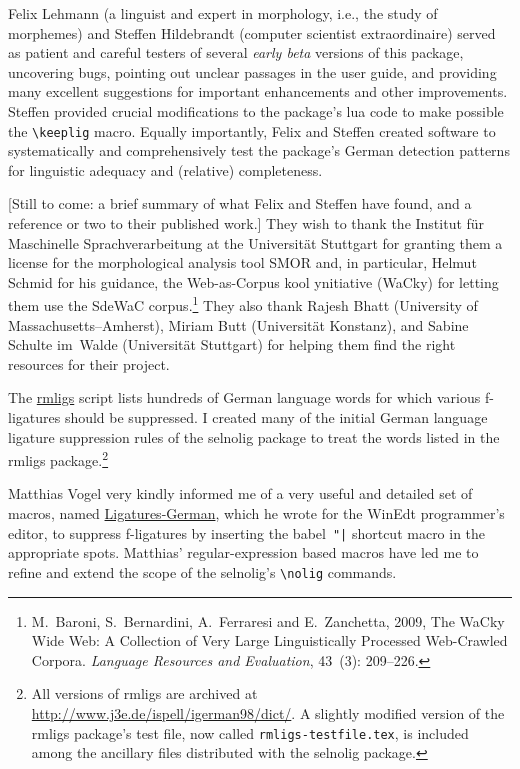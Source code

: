 \documentclass[12pt]{article}
\newcommand{\pkg}[1]{\textsf{#1}}
\newcommand{\opt}[1]{\texttt{#1}}
\newcommand{\cmmd}[1]{\texttt{\textbackslash #1}}
\begin{document}
Felix Lehmann (a linguist and expert in morphology, i.e., the study of morphemes) and Steffen Hildebrandt (computer scientist extraordinaire) served as patient and careful testers of several \emph{early beta} versions of this package, uncovering bugs, pointing out unclear passages in the user guide, and providing many excellent suggestions for important enhancements and other improvements. Steffen provided crucial modifications to the package's lua code to make possible the \cmmd{keeplig} macro. Equally importantly, Felix and Steffen created software to systematically and comprehensively test the package's German detection patterns for linguistic adequacy and (relative) completeness.

[Still to come: a brief summary of what Felix and Steffen have found, and a reference or two to their published work.] They wish to thank the Institut für Maschinelle Sprachverarbeitung at the Universität Stuttgart for granting them a license for the morphological analysis tool SMOR and, in particular, Helmut Schmid for his guidance, the Web-as-Corpus kool ynitiative (WaCky) for letting them use the SdeWaC corpus.\footnote{M.~Baroni, S.~Bernardini, A.~Ferraresi and E.~Zanchetta, 2009, The WaCky Wide Web: A Collection of Very Large Linguistically Processed Web-Crawled Corpora. \emph{Language Resources and Evaluation}, 43~(3): 209--226.} They also thank Rajesh Bhatt (University of Massachusetts--Amherst), Miriam Butt (Universität Konstanz), and Sabine Schulte im~Walde (Universität Stuttgart) for helping them find the right resources for their project.

The \href{http://www.ctan.org/tex-archive/support/rmligs}{\pkg{rmligs}} script lists hundreds of German language words for which various f\nobreak-liga\-tures should be suppressed. I created many of the initial German language ligature suppression rules of the \pkg{selnolig} package to treat the words listed in the \pkg{rmligs} package.\footnote{All versions of \pkg{rmligs} are archived at \url{http://www.j3e.de/ispell/igerman98/dict/}. A slightly modified version of the \pkg{rmligs} package's test file, now called \opt{rmligs-testfile.tex}, is included among the ancillary files distributed with the \pkg{selnolig} package.} 

Matthias Vogel very kindly informed me of a very useful and detailed set of macros, named \href{http://www.winedt.org/Macros/LaTeX/Ligatures-German.php}{Ligatures-German}, which he wrote for the WinEdt programmer's editor, to suppress f-ligatures by inserting the \pkg{babel}~\Verb+"|+ shortcut macro in the appropriate spots. Matthias' regular-expression based macros have led me to refine and extend the scope of the \pkg{selnolig}'s \cmmd{nolig} commands.
\end{document}

